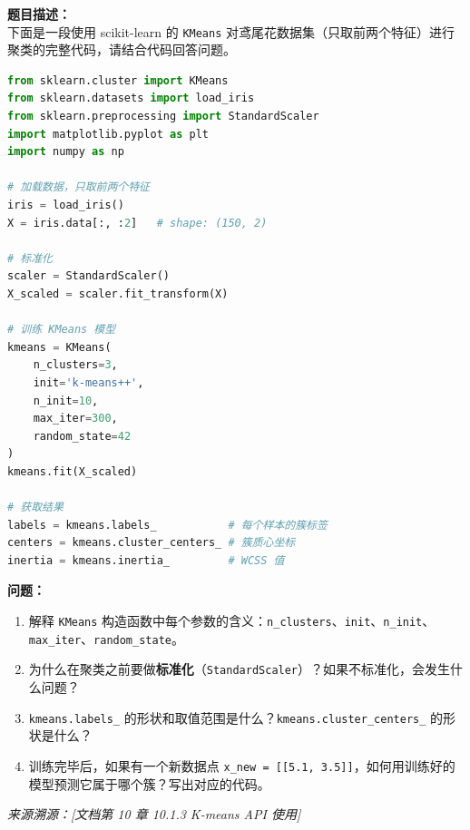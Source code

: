 \documentclass[a4paper,11pt]{ctexart}
\begin{document}
\begin{problembox}
    \textbf{题目描述：}\\
    下面是一段使用 scikit-learn 的 \texttt{KMeans} 对鸢尾花数据集（只取前两个特征）进行聚类的完整代码，请结合代码回答问题。

    \begin{lstlisting}[language=Python]
from sklearn.cluster import KMeans
from sklearn.datasets import load_iris
from sklearn.preprocessing import StandardScaler
import matplotlib.pyplot as plt
import numpy as np

# 加载数据，只取前两个特征
iris = load_iris()
X = iris.data[:, :2]   # shape: (150, 2)

# 标准化
scaler = StandardScaler()
X_scaled = scaler.fit_transform(X)

# 训练 KMeans 模型
kmeans = KMeans(
    n_clusters=3,
    init='k-means++',
    n_init=10,
    max_iter=300,
    random_state=42
)
kmeans.fit(X_scaled)

# 获取结果
labels = kmeans.labels_           # 每个样本的簇标签
centers = kmeans.cluster_centers_ # 簇质心坐标
inertia = kmeans.inertia_         # WCSS 值
    \end{lstlisting}

    \vspace{0.2cm}
    \textbf{问题：}
    \begin{enumerate}[(1)]
        \item 解释 \texttt{KMeans} 构造函数中每个参数的含义：\texttt{n\_clusters}、\texttt{init}、\texttt{n\_init}、\texttt{max\_iter}、\texttt{random\_state}。

        \item 为什么在聚类之前要做\textbf{标准化}（\texttt{StandardScaler}）？如果不标准化，会发生什么问题？

        \item \texttt{kmeans.labels\_} 的形状和取值范围是什么？\texttt{kmeans.cluster\_centers\_} 的形状是什么？

        \item 训练完毕后，如果有一个新数据点 \texttt{x\_new = [[5.1, 3.5]]}，如何用训练好的模型预测它属于哪个簇？写出对应的代码。
    \end{enumerate}

    \vspace{0.2cm}
    {\color{gray}\small\textit{来源溯源：[文档第 10 章 10.1.3 K-means API 使用]}}
\end{problembox}
\end{document}
